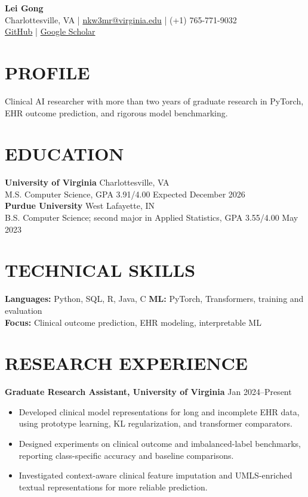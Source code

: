 \documentclass[10pt, letterpaper]{article}
\begin{document}
\setlength{\parindent}{0pt}
\begin{center}
{\fontsize{23}{25}\selectfont\textbf{Lei Gong}}\\[3pt]
Charlottesville, VA \quad | \quad \href{mailto:nkw3mr@virginia.edu}{nkw3mr@virginia.edu} \quad | \quad (+1) 765-771-9032\\[2pt]
\href{https://github.com/LeiGong0125Carrot}{GitHub} \quad | \quad \href{https://scholar.google.com/citations?user=8QLAkKMAAAAJ}{Google Scholar}
\end{center}
\vspace{-3mm}
\section{PROFILE}
Clinical AI researcher with more than two years of graduate research in PyTorch, EHR outcome prediction, and rigorous model benchmarking.
\section{EDUCATION}
\textbf{University of Virginia} \hfill Charlottesville, VA \\
M.S. Computer Science, GPA 3.91/4.00 \hfill Expected December 2026\\[1pt]
\textbf{Purdue University} \hfill West Lafayette, IN \\
B.S. Computer Science; second major in Applied Statistics, GPA 3.55/4.00 \hfill May 2023
\section{TECHNICAL SKILLS}
\textbf{Languages:} Python, SQL, R, Java, C \quad \textbf{ML:} PyTorch, Transformers, training and evaluation\\
\textbf{Focus:} Clinical outcome prediction, EHR modeling, interpretable ML
\section{RESEARCH EXPERIENCE}
\textbf{Graduate Research Assistant, University of Virginia} \hfill Jan 2024--Present
\begin{itemize}
\item Developed clinical model representations for long and incomplete EHR data, using prototype learning, KL regularization, and transformer comparators.
\item Designed experiments on clinical outcome and imbalanced-label benchmarks, reporting class-specific accuracy and baseline comparisons.
\item Investigated context-aware clinical feature imputation and UMLS-enriched textual representations for more reliable prediction.
\end{itemize}
\end{document}
